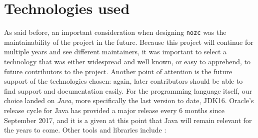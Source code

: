 \section{Technologies used}\label{sec:ch3-technologies}
As said before, an important consideration when designing \texttt{nozc} was the maintainability of the project in the future.
Because this project will continue for multiple years and see different maintainers, it was important to select a technology that was either widespread and well known, or easy to apprehend, to future contributors to the project.
Another point of attention is the future support of the technologies chosen: again, later contributors should be able to find support and documentation easily.
For the programming language itself, our choice landed on \textit{Java}, more specifically the last version to date, JDK16.
Oracle's release cycle for Java has provided a major release every 6 months since September 2017, and it is a given at this point that Java will remain relevant for the years to come.
Other tools and libraries include :
